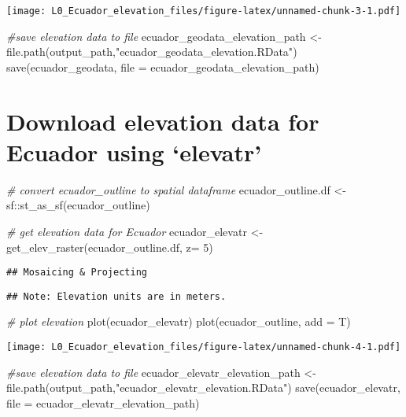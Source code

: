 \documentclass[
]{article}
\newenvironment{Shaded}{\begin{snugshade}}{\end{snugshade}}
\newcommand{\AttributeTok}[1]{\textcolor[rgb]{0.77,0.63,0.00}{#1}}
\newcommand{\CommentTok}[1]{\textcolor[rgb]{0.56,0.35,0.01}{\textit{#1}}}
\newcommand{\DecValTok}[1]{\textcolor[rgb]{0.00,0.00,0.81}{#1}}
\newcommand{\FunctionTok}[1]{\textcolor[rgb]{0.00,0.00,0.00}{#1}}
\newcommand{\NormalTok}[1]{#1}
\newcommand{\OtherTok}[1]{\textcolor[rgb]{0.56,0.35,0.01}{#1}}
\newcommand{\SpecialCharTok}[1]{\textcolor[rgb]{0.00,0.00,0.00}{#1}}
\newcommand{\StringTok}[1]{\textcolor[rgb]{0.31,0.60,0.02}{#1}}
\begin{document}
\texttt{[image: L0\_Ecuador\_elevation\_files/figure-latex/unnamed-chunk-3-1.pdf]}

\begin{Shaded}
\begin{Highlighting}[]
\CommentTok{\#save elevation data to file}
\NormalTok{ecuador\_geodata\_elevation\_path }\OtherTok{\textless{}{-}} \FunctionTok{file.path}\NormalTok{(output\_path,}\StringTok{"ecuador\_geodata\_elevation.RData"}\NormalTok{) }
\FunctionTok{save}\NormalTok{(ecuador\_geodata, }\AttributeTok{file =}\NormalTok{ ecuador\_geodata\_elevation\_path)}
\end{Highlighting}
\end{Shaded}

\hypertarget{download-elevation-data-for-ecuador-using-elevatr}{%
\section{Download elevation data for Ecuador using
`elevatr'}\label{download-elevation-data-for-ecuador-using-elevatr}}

\begin{Shaded}
\begin{Highlighting}[]
\CommentTok{\# convert ecuador\_outline to spatial dataframe}
\NormalTok{ecuador\_outline.df }\OtherTok{\textless{}{-}}\NormalTok{ sf}\SpecialCharTok{::}\FunctionTok{st\_as\_sf}\NormalTok{(ecuador\_outline)}

\CommentTok{\# get elevation data for Ecuador}
\NormalTok{ecuador\_elevatr }\OtherTok{\textless{}{-}} \FunctionTok{get\_elev\_raster}\NormalTok{(ecuador\_outline.df, }\AttributeTok{z=} \DecValTok{5}\NormalTok{)}
\end{Highlighting}
\end{Shaded}

\begin{verbatim}
## Mosaicing & Projecting
\end{verbatim}

\begin{verbatim}
## Note: Elevation units are in meters.
\end{verbatim}

\begin{Shaded}
\begin{Highlighting}[]
\CommentTok{\# plot elevation}
\FunctionTok{plot}\NormalTok{(ecuador\_elevatr)}
\FunctionTok{plot}\NormalTok{(ecuador\_outline, }\AttributeTok{add =}\NormalTok{ T)}
\end{Highlighting}
\end{Shaded}

\texttt{[image: L0\_Ecuador\_elevation\_files/figure-latex/unnamed-chunk-4-1.pdf]}

\begin{Shaded}
\begin{Highlighting}[]
\CommentTok{\#save elevation data to file}
\NormalTok{ecuador\_elevatr\_elevation\_path }\OtherTok{\textless{}{-}} \FunctionTok{file.path}\NormalTok{(output\_path,}\StringTok{"ecuador\_elevatr\_elevation.RData"}\NormalTok{) }
\FunctionTok{save}\NormalTok{(ecuador\_elevatr, }\AttributeTok{file =}\NormalTok{ ecuador\_elevatr\_elevation\_path)}
\end{Highlighting}
\end{Shaded}
\end{document}
